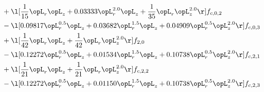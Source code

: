 \begin{alignat}{2}
& + \l[ \frac{1}{15} \opL_r \opL_z +  0.03333 \opL_r^{2.0} \opL_z + \frac{1}{35} \opL_r \opL_z^{2.0}  \r] f_{c,0,2} \nonumber \\ 
& - \l[  0.09817 \opL_r^{0.5} \opL_z +  0.03682 \opL_r^{1.5} \opL_z +  0.04909 \opL_r^{0.5} \opL_z^{2.0}  \r] f_{c,0,3} \nonumber \\ 
& + \l[ \frac{1}{42} \opL_r \opL_z + \frac{1}{42} \opL_r \opL_z^{2.0}  \r] f_{2,0} \nonumber \\ 
& - \l[  0.12272 \opL_r^{0.5} \opL_z +  0.01534 \opL_r^{1.5} \opL_z +  0.10738 \opL_r^{0.5} \opL_z^{2.0}  \r] f_{c,2,1} \nonumber \\ 
& + \l[ \frac{1}{21} \opL_r \opL_z + \frac{1}{21} \opL_r \opL_z^{2.0}  \r] f_{c,2,2} \nonumber \\ 
& - \l[  0.12272 \opL_r^{0.5} \opL_z +  0.01150 \opL_r^{1.5} \opL_z +  0.10738 \opL_r^{0.5} \opL_z^{2.0}  \r] f_{c,2,3} \nonumber \\ 
\end{alignat} 


